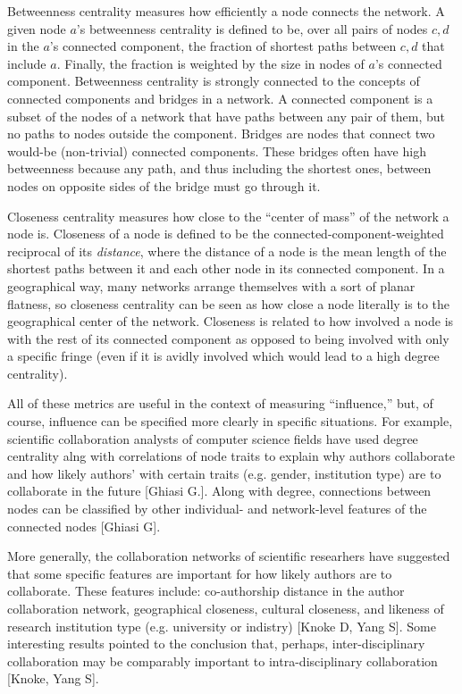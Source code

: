 \documentclass{article}
\begin{document}
Betweenness centrality measures how efficiently a node connects the network.
A given node $a$'s betweenness centrality is defined to be, over all pairs of nodes $c, d$ in the $a$'s connected component, the fraction of shortest paths between $c,d$ that include $a$.
Finally, the fraction is weighted by the size in nodes of $a$'s connected component.
Betweenness centrality is strongly connected to the concepts of connected components and bridges in a network. A connected component is a subset of the nodes of a network that have paths between any pair of them, but no paths to nodes outside the component.
Bridges are nodes that connect two would-be (non-trivial) connected components.
These bridges often have high betweenness because any path, and thus including the shortest ones, between nodes on opposite sides of the bridge must go through it.

Closeness centrality measures how close to the ``center of mass'' of the network a node is.
Closeness of a node is defined to be the connected-component-weighted reciprocal of its \textit{distance}, where the distance of a node is the mean length of the shortest paths between it and each other node in its connected component.
In a geographical way, many networks arrange themselves with a sort of planar flatness, so closeness centrality can be seen as how close a node literally is to the geographical center of the network.
Closeness is related to how involved a node is with the rest of its connected component as opposed to being involved with only a specific fringe (even if it is avidly involved which would lead to a high degree centrality).

All of these metrics are useful in the context of measuring ``influence,'' but, of course, influence can be specified more clearly in specific situations.
For example, scientific collaboration analysts of computer science fields have used degree centrality alng with correlations of node traits to explain why authors collaborate and how likely authors' with certain traits (e.g. gender, institution type) are to collaborate in the future [Ghiasi G.].
Along with degree, connections between nodes can be classified by other individual- and network-level features of the connected nodes [Ghiasi G].

More generally, the collaboration networks of scientific researhers have suggested that some specific features are important for how likely authors are to collaborate. These features include: co-authorship distance in the author collaboration network, geographical closeness, cultural closeness, and likeness of research institution type (e.g. university or indistry) [Knoke D, Yang S].
Some interesting results pointed to the conclusion that, perhaps, inter-disciplinary collaboration may be comparably important to intra-disciplinary collaboration [Knoke, Yang S].
\end{document}
